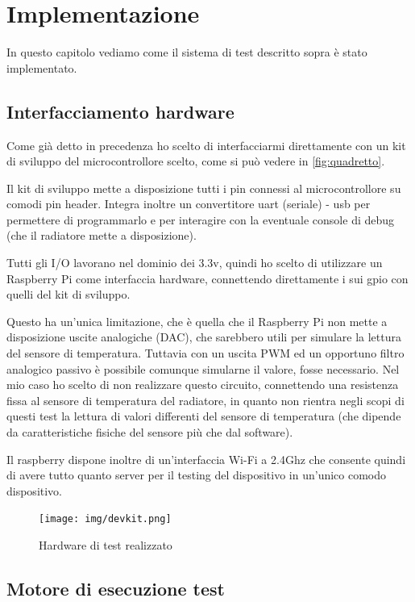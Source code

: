 \documentclass[12pt,a4paper,twoside,titlepage]{book}
\begin{document}
\chapter{Implementazione}

In questo capitolo vediamo come il sistema di test descritto sopra è stato implementato.

\section{Interfacciamento hardware}

Come già detto in precedenza ho scelto di interfacciarmi direttamente con un kit
di sviluppo del microcontrollore scelto, come si può vedere in \autoref{fig:quadretto}.

Il kit di sviluppo mette a disposizione tutti i pin connessi al microcontrollore
su comodi pin header. Integra inoltre un convertitore \Gls{uart} (seriale) - \acrshort{usb} per
permettere di programmarlo e per interagire con la eventuale console di debug
(che il radiatore mette a disposizione).

Tutti gli I/O lavorano nel dominio dei 3.3v, quindi ho scelto di utilizzare un
Raspberry Pi come interfaccia hardware, connettendo direttamente i sui \Gls{gpio} con
quelli del kit di sviluppo.

Questo ha un'unica limitazione, che è quella che il Raspberry Pi non mette a disposizione
uscite analogiche (DAC), che sarebbero utili per simulare la lettura del sensore di
temperatura. Tuttavia con un uscita PWM ed un opportuno filtro analogico passivo è
possibile comunque simularne il valore, fosse necessario. Nel mio caso ho scelto di
non realizzare questo circuito, connettendo una resistenza fissa al sensore di
temperatura del radiatore, in quanto non rientra negli scopi di questi test la lettura
di valori differenti del sensore di temperatura (che dipende da caratteristiche fisiche
del sensore più che dal software).

Il raspberry dispone inoltre di un'interfaccia Wi-Fi a 2.4Ghz che consente quindi di
avere tutto quanto server per il testing del dispositivo in un'unico comodo dispositivo.

\begin{figure}
    \centering
    \texttt{[image: img/devkit.png]}
    \caption{Hardware di test realizzato}
    \label{fig:quadretto}
\end{figure}

\section{Motore di esecuzione test}
\end{document}
